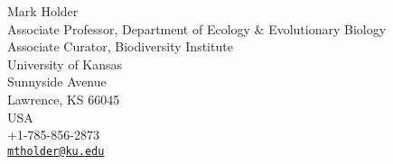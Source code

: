 Mark Holder \\
\myIndent Associate Professor, Department of Ecology \& Evolutionary Biology \\
\myIndent Associate Curator, Biodiversity Institute \\
\myIndent University of Kansas \\
 Sunnyside Avenue \\
\myIndent Lawrence, KS 66045 \\
\myIndent USA \\
\myIndent +1-785-856-2873 \\
\myIndent \href{mailto:mtholder@ku.edu}{\tt mtholder@ku.edu}



